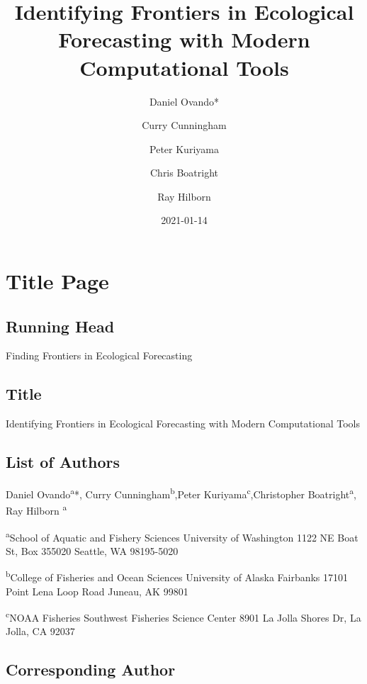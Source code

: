 \documentclass[
]{article}
\title{Identifying Frontiers in Ecological Forecasting with Modern Computational Tools}
\author{Daniel Ovando* \and Curry Cunningham \and Peter Kuriyama \and Chris Boatright \and Ray Hilborn}
\date{2021-01-14}
\begin{document}
\maketitle

\newpage

\hypertarget{title-page}{%
\section*{Title Page}\label{title-page}}

\hypertarget{running-head}{%
\subsection*{Running Head}\label{running-head}}

Finding Frontiers in Ecological Forecasting

\hypertarget{title}{%
\subsection*{Title}\label{title}}

Identifying Frontiers in Ecological Forecasting with Modern Computational Tools

\hypertarget{list-of-authors}{%
\subsection*{List of Authors}\label{list-of-authors}}

Daniel Ovando\textsuperscript{a}*, Curry Cunningham\textsuperscript{b},Peter Kuriyama\textsuperscript{c},Christopher Boatright\textsuperscript{a}, Ray Hilborn \textsuperscript{a}

\textsuperscript{a}School of Aquatic and Fishery Sciences University of Washington 1122 NE Boat St, Box 355020 Seattle, WA 98195-5020

\textsuperscript{b}College of Fisheries and Ocean Sciences University of Alaska Fairbanks 17101 Point Lena Loop Road Juneau, AK 99801

\textsuperscript{c}NOAA Fisheries Southwest Fisheries Science Center 8901 La Jolla Shores Dr, La Jolla, CA 92037

\hypertarget{corresponding-author}{%
\subsection*{Corresponding Author}\label{corresponding-author}}
\end{document}
